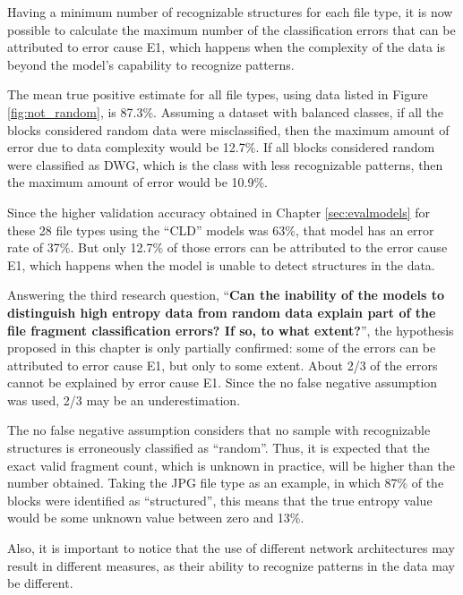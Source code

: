 Having a minimum number of recognizable structures for each file type, it is now possible to calculate the maximum number of the classification errors that can be attributed to error cause E1, which happens when the complexity of the data is beyond the model’s capability to recognize patterns.

The mean true positive estimate for all file types, using data listed in Figure \ref{fig:not_random}, is 87.3\%.  Assuming a dataset with balanced classes, if all the blocks considered random data were misclassified, then the maximum amount of error due to data complexity would be 12.7\%. If all blocks considered random were classified as DWG, which is the class with less recognizable patterns, then the maximum amount of error would be 10.9\%.

Since the higher validation accuracy obtained in Chapter \ref{sec:evalmodels} for these 28 file types using the ``CLD'' models was 63\%, that model has an error rate of 37\%. But only 12.7\% of those errors can be attributed to the error cause E1, which happens when the model is unable to detect structures in the data.

{\color{red}
Answering the third research question, ``\textbf{Can the inability of the models to distinguish high entropy data from random data explain part of the file fragment classification errors? If so, to what extent?}'',
}
the hypothesis proposed in this chapter is only partially confirmed: some of the errors can be attributed to error cause E1, but only to some extent. About 2/3 of the errors cannot be explained by error cause E1. Since the no false negative assumption was used, 2/3 may be an underestimation.

The no false negative assumption considers that no sample with recognizable structures is erroneously classified as ``random''. Thus, it is expected that the exact valid fragment count, which is unknown in practice, will be higher than the number obtained. Taking the JPG file type as an example, in which 87\% of the blocks were identified as ``structured'', this means that the true entropy value would be some unknown value between zero and 13\%.

Also, it is important to notice that the use of different network architectures may result in different measures, as their ability to recognize patterns in the data may be different.
